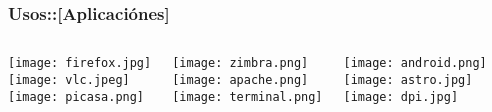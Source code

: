\documentclass[xcolor=svgnames]{beamer}
\begin{document}
%
%	
%						
%
%	

	\begin{frame}
	
		\frametitle{\textbf{Usos:}:[Aplicaci\'ones]}
		
		\begin{columns}
			
					\begin{center}
						\texttt{[image: firefox.jpg]} \\
						\texttt{[image: vlc.jpeg]} \\
						\texttt{[image: picasa.png]}
					\end{center}

					\begin{center}					
						\texttt{[image: zimbra.png]} \\
						\texttt{[image: apache.png]} \\
						\texttt{[image: terminal.png]}
					\end{center}
				
					\begin{center}
						\texttt{[image: android.png]} \\
						\texttt{[image: astro.jpg]} \\
						\texttt{[image: dpi.jpg]}
					\end{center}
					
			\end{columns}
		
	\end{frame}

%
%	
%						
%
%
\end{document}
